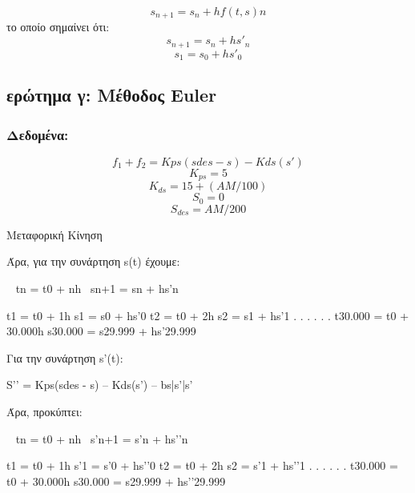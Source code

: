 \documentclass[a4paper]{article}
\begin{document}
        \[s_{n+1}=s_n+hf(t,s)n\]
        το οποίο σημαίνει ότι:
        \[s_{n+1}=s_n+hs'_n\]
        \[s_1=s_0+hs'_0\]
        \subsection{ερώτημα γ: Μέθοδος Euler}

        \subsubsection{Δεδομένα:}
        \begin{equation}
            f_1 + f_2 = Kps (sdes - s) - Kds (s')
        \end{equation}
        \begin{equation}
            K_{ps} = 5
        \end{equation}
        \begin{equation}
            K_{ds} = 15 + (AM/ 100)
        \end{equation}
        \begin{equation}
            S_0 =0
        \end{equation}
        \begin{equation}
            S_{des} = AM / 200
        \end{equation}
            
        

        Μεταφορική Κίνηση


        Άρα, για την συνάρτηση s(t) έχουμε:

        ~ tn = t0 + nh					~sn+1 = sn  + hs’n

        t1 = t0  + 1h					   s1    = s0  + hs’­­­0
        t2 = t0  + 2h					   s2    = s1  + hs’1
            .						     .
            .						     .
            .						     .
        t30.000 = t0 + 30.000h			    s30.000 = s29.999 + hs’29.999
            
        Για την συνάρτηση s’(t):

            S’’	= Kps(sdes - s) – Kds(s’) – bs|s’|s’

            Άρα, προκύπτει:

        ~ tn = t0 + nh					~s’n+1 = s’n  + hs’’n

        t1 = t0  + 1h					   s’1    = s’0  + hs’’­­­0
        t2 = t0  + 2h					   s2    = s’1  + hs’’1
            .						     .
            .						     .
            .						     .
        t30.000 = t0 + 30.000h			   s30.000 = s29.999 + hs’’29.999
\end{document}
